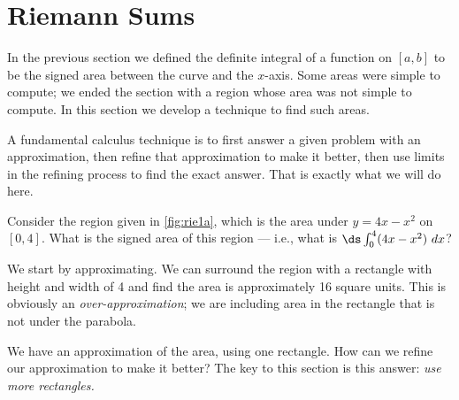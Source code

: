 \section{Riemann Sums}\label{sec:riemann}

In the previous section we defined the definite integral of a function on $[a,b]$ to be the signed area between the curve and the $x$-axis. Some areas were simple to compute; we ended the section with a region whose area was not simple to compute. In this section we develop a technique to find such areas.

A fundamental calculus technique is to first answer a given problem with an approximation, then refine that approximation to make it better, then use limits in the refining process to find the exact answer. That is exactly what we will do here.

Consider the region given in \autoref{fig:rie1a}, which is the area under $y=4x-x^2$ on $[0,4]$. What is the signed area of this region --- i.e., what is $\ds\int_0^4(4x-x^2)\ dx$?


We start by approximating. We can surround the region with a rectangle with height and width of 4 and find the area is approximately 16 square units. This is obviously an \textit{over-approximation}; we are including area in the rectangle that is not under the parabola. 


We have an approximation of the area, using one rectangle. How can we refine our approximation to make it better? The key to this section is this answer: \textit{use more rectangles.}

